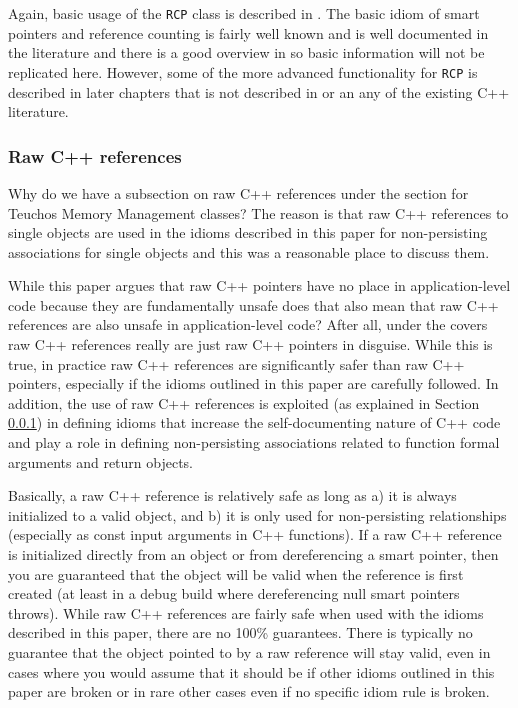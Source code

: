 \documentclass[pdf,ps2pdf,11pt]{SANDreport}
\begin{document}
Again, basic usage of the {}\texttt{RCP} class is described in
{}\cite{RefCountPtrBeginnersGuide}.  The basic idiom of smart pointers and
reference counting is fairly well known and is well documented in the
literature and there is a good overview in {}\cite{RefCountPtrBeginnersGuide}
so basic information will not be replicated here.  However, some of the more
advanced functionality for {}\texttt{RCP} is described in later chapters that
is not described in {}\cite{RefCountPtrBeginnersGuide} or an any of the
existing C++ literature.


%
{}\subsubsection{Raw C++ references}
\label{sec:raw-C++-references}
%

Why do we have a subsection on raw C++ references under the section
for Teuchos Memory Management classes?  The reason is that raw C++
references to single objects are used in the idioms described in this
paper for non-persisting associations for single objects and this was
a reasonable place to discuss them.

While this paper argues that raw C++ pointers have no place in
application-level code because they are fundamentally unsafe does that
also mean that raw C++ references are also unsafe in application-level
code?  After all, under the covers raw C++ references really are just
raw C++ pointers in disguise.  While this is true, in practice raw C++
references are significantly safer than raw C++ pointers, especially
if the idioms outlined in this paper are carefully followed.  In
addition, the use of raw C++ references is exploited (as explained in
Section {}\ref{sec:raw-C++-references}) in defining idioms that
increase the self-documenting nature of C++ code and play a role in
defining non-persisting associations related to function formal
arguments and return objects.

Basically, a raw C++ reference is relatively safe as long as a) it is
always initialized to a valid object, and b) it is only used for
non-persisting relationships (especially as const input arguments in
C++ functions).  If a raw C++ reference is initialized directly from an
object or from dereferencing a smart pointer, then you are guaranteed
that the object will be valid when the reference is first created (at
least in a debug build where dereferencing null smart pointers
throws).  While raw C++ references are fairly safe when used with the
idioms described in this paper, there are no 100\% guarantees.  There
is typically no guarantee that the object pointed to by a raw reference
will stay valid, even in cases where you would assume that it should
be if other idioms outlined in this paper are broken or in rare other
cases even if no specific idiom rule is broken.
\end{document}

